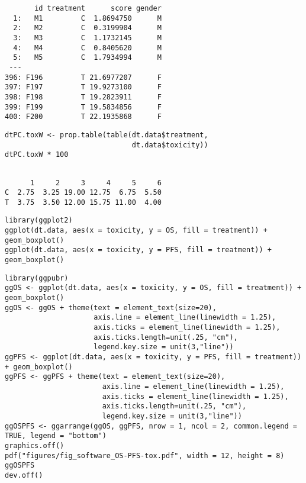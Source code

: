 \documentclass[12pt]{article}
\begin{document}
\begin{verbatim}
       id treatment      score gender
  1:   M1         C  1.8694750      M
  2:   M2         C  0.3199904      M
  3:   M3         C  1.1732145      M
  4:   M4         C  0.8405620      M
  5:   M5         C  1.7934994      M
 ---                                 
396: F196         T 21.6977207      F
397: F197         T 19.9273100      F
398: F198         T 19.2823911      F
399: F199         T 19.5834856      F
400: F200         T 22.1935868      F
\end{verbatim}


\lstset{language=r,label= ,caption= ,captionpos=b,numbers=none}
\begin{lstlisting}
dtPC.toxW <- prop.table(table(dt.data$treatment,
                              dt.data$toxicity))
dtPC.toxW * 100
\end{lstlisting}

\begin{verbatim}

      1     2     3     4     5     6
C  2.75  3.25 19.00 12.75  6.75  5.50
T  3.75  3.50 12.00 15.75 11.00  4.00
\end{verbatim}


\lstset{language=r,label= ,caption= ,captionpos=b,numbers=none}
\begin{lstlisting}
library(ggplot2)
ggplot(dt.data, aes(x = toxicity, y = OS, fill = treatment)) + geom_boxplot()
ggplot(dt.data, aes(x = toxicity, y = PFS, fill = treatment)) + geom_boxplot()
\end{lstlisting}

\lstset{language=r,label= ,caption= ,captionpos=b,numbers=none}
\begin{lstlisting}
library(ggpubr)
ggOS <- ggplot(dt.data, aes(x = toxicity, y = OS, fill = treatment)) + geom_boxplot()
ggOS <- ggOS + theme(text = element_text(size=20), 
                     axis.line = element_line(linewidth = 1.25),
                     axis.ticks = element_line(linewidth = 1.25),
                     axis.ticks.length=unit(.25, "cm"),
                     legend.key.size = unit(3,"line"))
ggPFS <- ggplot(dt.data, aes(x = toxicity, y = PFS, fill = treatment)) + geom_boxplot()
ggPFS <- ggPFS + theme(text = element_text(size=20), 
                       axis.line = element_line(linewidth = 1.25),
                       axis.ticks = element_line(linewidth = 1.25),
                       axis.ticks.length=unit(.25, "cm"),
                       legend.key.size = unit(3,"line"))
ggOSPFS <- ggarrange(ggOS, ggPFS, nrow = 1, ncol = 2, common.legend = TRUE, legend = "bottom")
graphics.off()
pdf("figures/fig_software_OS-PFS-tox.pdf", width = 12, height = 8)
ggOSPFS
dev.off()
\end{lstlisting}
\end{document}
